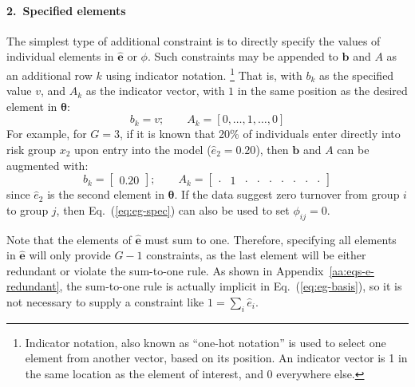\paragraph{2.~Specified elements}
\label{con:spec-element}
The simplest type of additional constraint is to
directly specify the values of individual elements in $\bm{\hat{e}}$ or $\phi$.
Such constraints may be appended to $\bm{b}$ and $A$
as an additional row $k$ using indicator notation.%
\footnote{Indicator notation, also known as ``one-hot notation'' is used to
  select one element from another vector, based on its position.
  An indicator vector is 1 in the same location as the element of interest,
  and 0 everywhere else.}
That is, with $b_k$ as the specified value $v$,
and $A_k$ as the indicator vector,
with $1$ in the same position as the desired element in $\bm{\theta}$:
\begin{equation}\label{eq:spec-elem}
b_k = v;\qquad
A_k = [0,\dots,1,\dots,0]
\end{equation}
For example, for $G = 3$, if it is known that 20\% of individuals
enter directly into risk group $x_2$ upon entry into the model ($\hat{e}_2 = 0.20$),
then $\bm{b}$ and $A$ can be augmented with:
\begin{equation}\label{eq:eg-spec}
b_k = \left[\begin{array}{c} 0.20 \end{array}\right];\qquad
A_k = \left[\begin{array}{ccccccccc}
	\cdot & 1 & \cdot & \cdot & \cdot & \cdot & \cdot & \cdot & \cdot
\end{array}\right] 
\end{equation}
since $\hat{e}_2$ is the second element in $\bm{\theta}$.
If the data suggest zero turnover from group $i$ to group $j$,
then Eq.~(\ref{eq:eg-spec}) can also be used to set $\phi_{ij} = 0$.
\par
Note that the elements of $\bm{\hat{e}}$ must sum to one.
Therefore, specifying all elements in $\bm{\hat{e}}$
will only provide $G-1$ constraints,
as the last element will be either redundant or violate the sum-to-one rule.
As shown in Appendix~\ref{aa:eqs-e-redundant},
the sum-to-one rule is actually implicit in Eq.~(\ref{eq:eg-basis}),
so it is not necessary to supply a constraint like $1 = \sum_{i} \hat{e}_i$.

